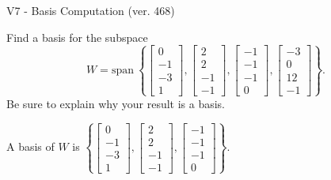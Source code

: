\begin{exercise}
  \begin{exerciseTitle}V7 - Basis Computation (ver. 468)\end{exerciseTitle}
  \begin{exerciseStatement}
    Find a basis for the subspace 
\[W=\mathrm{span}\ \left\{\left[\begin{array}{r}
0 \\
-1 \\
-3 \\
1
\end{array}\right] , \left[\begin{array}{r}
2 \\
2 \\
-1 \\
-1
\end{array}\right] , \left[\begin{array}{r}
-1 \\
-1 \\
-1 \\
0
\end{array}\right] , \left[\begin{array}{r}
-3 \\
0 \\
12 \\
-1
\end{array}\right]\right\}.\]
 Be sure to explain why your result is a basis.


  \end{exerciseStatement}
  \begin{exerciseAnswer}
   A basis of \(W\) is  \(\left\{\left[\begin{array}{r}
0 \\
-1 \\
-3 \\
1
\end{array}\right] , \left[\begin{array}{r}
2 \\
2 \\
-1 \\
-1
\end{array}\right] , \left[\begin{array}{r}
-1 \\
-1 \\
-1 \\
0
\end{array}\right]\right\}\).
  


  \end{exerciseAnswer}
\end{exercise}